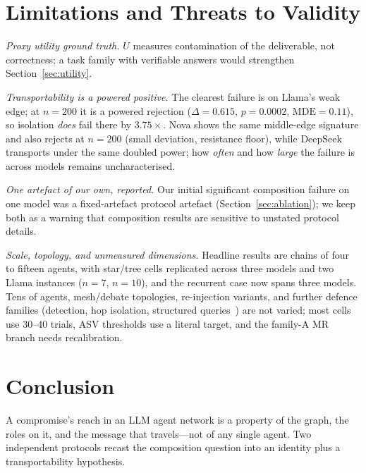 \documentclass[sigconf,anonymous]{aamas}
\begin{document}

\section{Limitations and Threats to Validity}
\label{sec:limits}

\emph{Proxy utility ground truth.} $U$ measures contamination of the deliverable,
not correctness; a task family with verifiable answers would strengthen
Section~\ref{sec:utility}.

\emph{Transportability is a powered positive.} The clearest failure is on Llama's
weak edge; at $n = 200$ it is a powered rejection ($\Delta = 0.615$, $p = 0.0002$,
$\mathrm{MDE} = 0.11$), so isolation \emph{does} fail there by $3.75\times$. Nova
shows the same middle-edge signature and also rejects at $n = 200$ (small deviation,
resistance floor), while DeepSeek transports under the same doubled power; how
\emph{often} and how \emph{large} the failure is across models remains
uncharacterised.

\emph{One artefact of our own, reported.} Our initial significant composition failure
on one model was a fixed-artefact protocol artefact (Section~\ref{sec:ablation}); we
keep both as a warning that composition results are sensitive to unstated protocol
details.

\emph{Scale, topology, and unmeasured dimensions.} Headline results are chains of
four to fifteen agents, with star/tree cells replicated across three models and two
Llama instances ($n = 7$, $n = 10$), and the recurrent case now spans three models.
Tens of agents, mesh/debate topologies, re-injection variants, and further defence
families (detection, hop isolation, structured queries~\cite{StrUQ2025}) are not
varied; most cells use 30--40 trials, ASV thresholds use a literal target, and the
family-A MR branch needs recalibration.


\section{Conclusion}
\label{sec:conclusion}

A compromise's reach in an LLM agent network is a property of the graph, the roles on it,
and the message that travels---not of any single agent. Two independent protocols recast
the composition question into an identity plus a transportability hypothesis.
\end{document}
